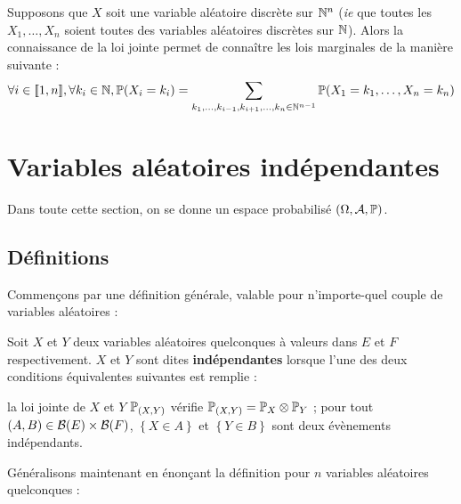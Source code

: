 \documentclass[../integ-proba.tex]{subfiles}
\begin{document}
    \begin{prop}
        \label{prop:connaissance_jointe_discrete}
        Supposons que $X$ soit une variable aléatoire discrète sur $\mathbb{N}^n$ (\textit{ie} que toutes les $X_1, \ldots, X_n$ soient toutes des variables aléatoires discrètes sur $\mathbb{N}$).
        Alors la connaissance de la loi jointe permet de connaître les lois marginales de la manière suivante :
        \begin{displaymath}
            \forall i \in [\![1, n]\!], \forall k_i \in \mathbb{N}, \mathbb{P}(X_i = k_i) = \sum_{k_1, \ldots, k_{i-1}, k_{i+1}, \ldots, k_n \in \mathbb{N}^{n-1}} \mathbb{P}(X_1 = k_1, \ldots, X_n = k_n)
        \end{displaymath}
    \end{prop}

    \section{Variables aléatoires indépendantes}

    Dans toute cette section, on se donne un espace probabilisé $\left( \Omega, \mathcal{A}, \mathbb{P} \right)$.

    \subsection{Définitions}

    Commençons par une définition générale, valable pour n'importe-quel couple de variables aléatoires :

    \begin{defi}
        Soit $X$ et $Y$ deux variables aléatoires quelconques à valeurs dans $E$ et $F$ respectivement.
        $X$ et $Y$ sont dites \textbf{indépendantes} lorsque l'une des deux conditions équivalentes suivantes est remplie :
        \begin{itemize}
            \itemb la loi jointe de $X$ et $Y$ $\mathbb{P}_{(X,Y)}$ vérifie $\mathbb{P}_{(X,Y)} = \mathbb{P}_X \otimes \mathbb{P}_Y$ ;
            \itemb pour tout $(A,B) \in \mathcal{B}(E) \times \mathcal{B}(F)$, $\left\{ X \in A \right\}$ et $\left\{ Y \in B \right\}$ sont deux évènements indépendants.
        \end{itemize}
    \end{defi}

    Généralisons maintenant en énonçant la définition pour $n$ variables aléatoires quelconques :
\end{document}
